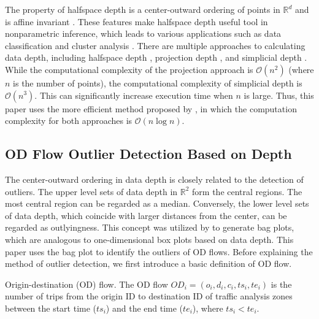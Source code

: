 \documentclass[a4paper,UKenglish]{lipics-v2018}
\begin{document}
The property of halfspace depth is a center-outward ordering of points in $\mathbb{R}^d$ and is affine invariant \cite{Mosler13book}.
These features make halfspace depth useful tool in nonparametric inference, which leads to various applications such as data classification and cluster analysis
\cite{lange14fSP,jeong16acmgis}.
There are multiple approaches to calculating data depth, including halfspace depth \cite{rousseeuw96RSS}, projection depth \cite{wilcox03CSSC}, and simplicial depth \cite{liu90AS}. While the computational complexity of the projection approach is $\mathcal{O}(n^2)$ (where $n$ is the number of points), the computational complexity of simplicial depth is $\mathcal{O}(n^3)$. This can significantly increase execution time when $n$ is large. Thus, this paper uses the more efficient method proposed by \cite{rousseeuw96RSS}, in which the computation complexity for both approaches is $\mathcal{O}(n\log{}n)$.



\subsection{OD Flow Outlier Detection Based on Depth}
The center-outward ordering in data depth is closely related to the detection of outliers. The upper level sets of data depth in $\mathbb{R}^2$ form the central regions. The most central region can be regarded as a median. Conversely, the lower level sets of data depth, which coincide with larger distances from the center, can be regarded as outlyingness. This concept was utilized by \cite{rousseeuw99AS,aplpackR} to generate bag plots, which are analogous to one-dimensional box plots based on data depth. This paper uses the bag plot to identify the outliers of OD flows. Before explaining the method of outlier detection, we first introduce a basic definition of OD flow.

%
%

\begin{definition}{Origin-destination (OD) flow.}
	The OD flow $OD_i = (o_i,d_i,c_i,ts_i, te_i)$ is the number of trips from the origin ID to destination ID of traffic analysis zones between the start time ($ts_i$) and the end time ($te_i$), where $ts_i<te_i$.
\end{definition}
\end{document}
